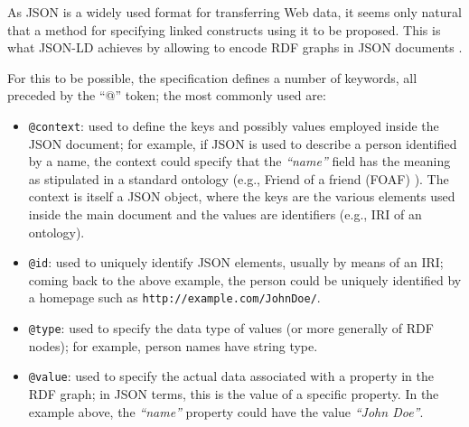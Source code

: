
As JSON is a widely used format for transferring Web data, it seems only
natural that a method for specifying linked constructs using it to be proposed.
This is what JSON-LD achieves by allowing to encode RDF graphs in JSON
documents \cite{ref:jsonld}.

For this to be possible, the specification defines a number of keywords, all
preceded by the ``@'' token; the most commonly used are:
\begin{itemize}
  \item \texttt{@context}: used to define the keys and possibly values employed
                           inside the JSON document; for example, if JSON
                           is used to describe a person identified by a name,
                           the context could specify that the \textit{``name''}
                           field has the meaning as stipulated in a standard
                           ontology (e.g., Friend of a friend
                           (FOAF) \cite{ref:foaf}). The context is itself a JSON
                           object, where the keys are the various elements used
                           inside the main document and the values are
                           identifiers (e.g., IRI of an ontology).
  \item \texttt{@id}: used to uniquely identify JSON elements, usually by
                      means of an IRI; coming back to the above example, the
                      person could be uniquely identified by a homepage such as
                      \texttt{http://example.com/JohnDoe/}.
  \item \texttt{@type}: used to specify the data type of values (or more
                        generally of RDF nodes); for example, person names have
                        string type.
  \item \texttt{@value}: used to specify the actual data associated with a
                         property in the RDF graph; in JSON terms, this is the
                         value of a specific property. In the example above, the
                         \textit{``name''} property could have the value
                         \textit{``John Doe''}.
\end{itemize}

